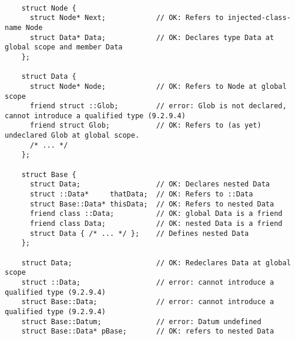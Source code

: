 \paragraph{} %
\begin{example}
  \begin{lstlisting}
    struct Node {
      struct Node* Next;            // OK: Refers to injected-class-name Node
      struct Data* Data;            // OK: Declares type Data at global scope and member Data
    };

    struct Data {
      struct Node* Node;            // OK: Refers to Node at global scope
      friend struct ::Glob;         // error: Glob is not declared, cannot introduce a qualified type (9.2.9.4)
      friend struct Glob;           // OK: Refers to (as yet) undeclared Glob at global scope.
      /* ... */
    };

    struct Base {
      struct Data;                  // OK: Declares nested Data
      struct ::Data*     thatData;  // OK: Refers to ::Data
      struct Base::Data* thisData;  // OK: Refers to nested Data
      friend class ::Data;          // OK: global Data is a friend
      friend class Data;            // OK: nested Data is a friend
      struct Data { /* ... */ };    // Defines nested Data
    };

    struct Data;                    // OK: Redeclares Data at global scope
    struct ::Data;                  // error: cannot introduce a qualified type (9.2.9.4)
    struct Base::Data;              // error: cannot introduce a qualified type (9.2.9.4)
    struct Base::Datum;             // error: Datum undefined
    struct Base::Data* pBase;       // OK: refers to nested Data
  \end{lstlisting}
\end{example}
